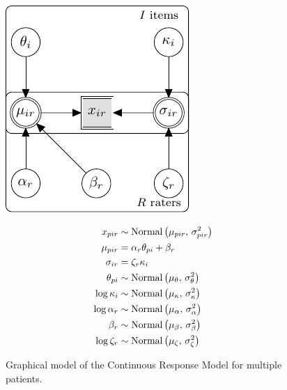 \documentclass[a4paper,11pt]{article}
\begin{document}
\begin{figure}[!ht]
	\begin{minipage}{0.5\textwidth}
		\centering
		\includegraphics[width=\textwidth, page=3]{graphicalmodels.pdf}
	\end{minipage}\hfill
	\begin{minipage}{0.5\textwidth}
		{\normalsize
			\begin{align*}
			x_{pir}      &\sim \text{Normal}\left(\mu_{pir},\,\sigma^2_{pir}\right) \\
			\mu_{pir}    &= \alpha_r \theta_{pi} + \beta_r  \\
			\sigma_{ir} 			&= \zeta_r \kappa_i\\
			\theta_{pi}	&\sim \text{Normal}\left(\mu_\theta,\,\sigma^2_\theta\right)\\
			\log \kappa_i 	&\sim \text{Normal}\left(\mu_\kappa,\,\sigma^2_\kappa\right)\\
			\log \alpha_r     	&\sim \text{Normal}\left(\mu_\alpha,\,\sigma^2_\alpha\right)\\
			\beta_r	   			&\sim \text{Normal}\left(\mu_\beta,\,\sigma^2_\beta\right)\\
			\log \zeta_r	&\sim \text{Normal}\left(\mu_\zeta,\,\sigma^2_\zeta\right)\\
			\end{align*}
		}%
	\end{minipage}
	\caption{Graphical model of the Continuous Response Model for multiple patients.}
	\label{model:CRM_p}
\end{figure}
\end{document}
